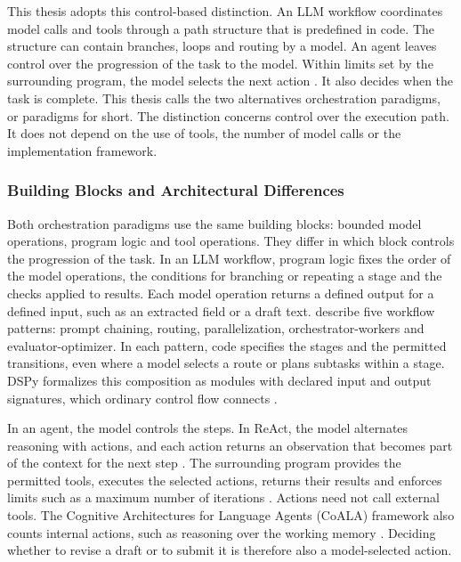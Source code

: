 This thesis adopts this control-based distinction. An LLM workflow coordinates model calls and tools through a path structure that is predefined in code. The structure can contain branches, loops and routing by a model. An agent leaves control over the progression of the task to the model. Within limits set by the surrounding program, the model selects the next action \parencite{schluntzBuildingEffectiveAI2024,Workflowsandgents}. It also decides when the task is complete. This thesis calls the two alternatives orchestration paradigms, or paradigms for short. The distinction concerns control over the execution path. It does not depend on the use of tools, the number of model calls or the implementation framework.

\subsubsection{Building Blocks and Architectural Differences}
\label{subsubsec:theory/control}

Both orchestration paradigms use the same building blocks: bounded model operations, program logic and tool operations. They differ in which block controls the progression of the task. In an LLM workflow, program logic fixes the order of the model operations, the conditions for branching or repeating a stage and the checks applied to results. Each model operation returns a defined output for a defined input, such as an extracted field or a draft text. \textcite{schluntzBuildingEffectiveAI2024} describe five workflow patterns: prompt chaining, routing, parallelization, orchestrator-workers and evaluator-optimizer. In each pattern, code specifies the stages and the permitted transitions, even where a model selects a route or plans subtasks within a stage. DSPy formalizes this composition as modules with declared input and output signatures, which ordinary control flow connects \parencite{khattabDSPyCompilingDeclarative2023}.

In an agent, the model controls the steps. In ReAct, the model alternates reasoning with actions, and each action returns an observation that becomes part of the context for the next step \parencite{yaoReActSynergizingReasoning2023}. The surrounding program provides the permitted tools, executes the selected actions, returns their results and enforces limits such as a maximum number of iterations \parencite{schluntzBuildingEffectiveAI2024}. Actions need not call external tools. The Cognitive Architectures for Language Agents (CoALA) framework also counts internal actions, such as reasoning over the working memory \parencite{sumersCognitiveArchitecturesLanguage2024}. Deciding whether to revise a draft or to submit it is therefore also a model-selected action.

